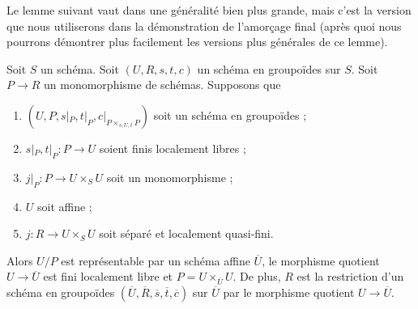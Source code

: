 \medskip\noindent
Le lemme suivant vaut dans une généralité bien plus grande, mais c'est
la version que nous utiliserons dans la démonstration de l'amorçage final (après quoi
nous pourrons démontrer plus facilement les versions plus générales de ce lemme).

\begin{lemma}
\label{lemma-divide-subgroupoid}
Soit $S$ un schéma.
Soit $(U, R, s, t, c)$ un schéma en groupoïdes sur $S$.
Soit $P \to R$ un monomorphisme de schémas. Supposons que
\begin{enumerate}
\item $(U, P, s|_P, t|_P, c|_{P \times_{s, U, t}P})$ soit un schéma en groupoïdes ;
\item $s|_P, t|_P : P \to U$ soient finis localement libres ;
\item $j|_P : P \to U \times_S U$ soit un monomorphisme ;
\item $U$ soit affine ;
\item $j : R \to U \times_S U$ soit séparé et localement quasi-fini.
\end{enumerate}
Alors $U/P$ est représentable par un schéma affine $\overline{U}$, le
morphisme quotient $U \to \overline{U}$ est fini localement libre et
$P = U \times_{\overline{U}} U$. De plus, $R$ est la restriction d'un
schéma en groupoïdes
$(\overline{U}, \overline{R}, \overline{s}, \overline{t}, \overline{c})$
sur $\overline{U}$ par le morphisme quotient $U \to \overline{U}$.
\end{lemma}

